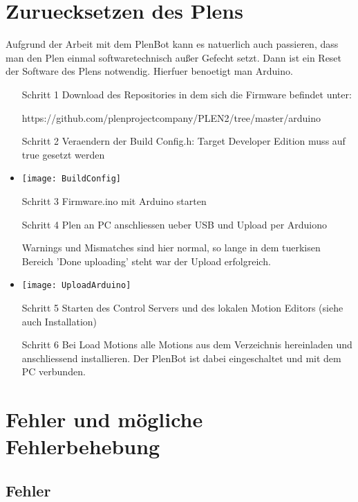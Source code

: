 \documentclass[11pt]{scrartcl}
\begin{document}
\newpage

\section{Zuruecksetzen des Plens}
\label{sec: Reset Plen}
Aufgrund der Arbeit mit dem PlenBot kann es natuerlich auch passieren, dass man den Plen einmal softwaretechnisch außer Gefecht setzt. Dann ist ein Reset der Software des Plens notwendig. Hierfuer benoetigt man Arduino. 
\begin{itemize}
\item[Schritt 1]
Download des Repositories in dem sich die Firmware befindet unter:

https://github.com/plenprojectcompany/PLEN2/tree/master/arduino 
\item[Schritt 2]
Veraendern der Build Config.h:
Target Developer Edition muss auf true gesetzt werden
\item
\begin{center}
\texttt{[image: BuildConfig]}
\end{center}

\item[Schritt 3]
Firmware.ino mit Arduino starten
\newpage
\item[Schritt 4]
Plen an PC anschliessen ueber USB und Upload per Arduiono

Warnings und Mismatches sind hier normal, so lange in dem tuerkisen Bereich 'Done uploading' steht war der Upload erfolgreich. 

\item
\begin{center}
\texttt{[image: UploadArduino]}
\end{center}

\item[Schritt 5]
Starten des Control Servers und des lokalen Motion Editors (siehe auch Installation)

\item[Schritt 6]
Bei Load Motions alle Motions aus dem Verzeichnis hereinladen und anschliessend installieren. Der PlenBot ist dabei eingeschaltet und mit dem PC verbunden.
\end{itemize}

\newpage
\section{Fehler und mögliche Fehlerbehebung}
\label{sec: Fehler/Fehlerbehebung}


\subsection{Fehler}
\label{subsec: Fehler}
\end{document}
